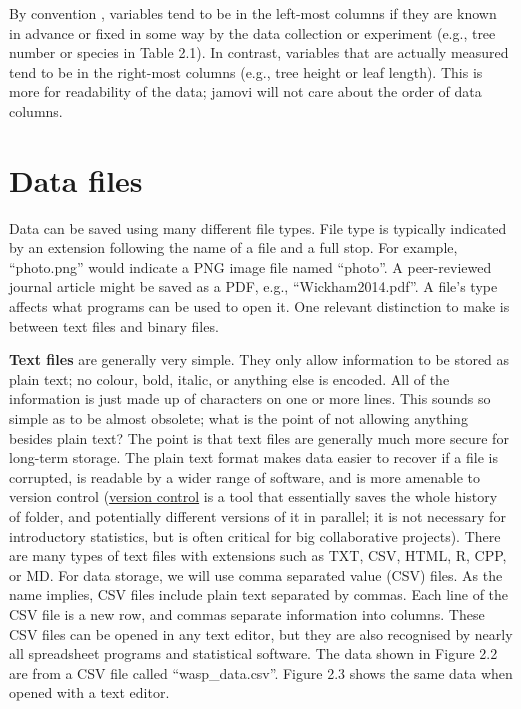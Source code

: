 \documentclass[
  openany]{scrbook}
\begin{document}
By convention \citep{Wickham2014}, variables tend to be in the left-most columns if they are known in advance or fixed in some way by the data collection or experiment (e.g., tree number or species in Table 2.1).
In contrast, variables that are actually measured tend to be in the right-most columns (e.g., tree height or leaf length).
This is more for readability of the data; jamovi will not care about the order of data columns.

\hypertarget{data-files}{%
\section{Data files}\label{data-files}}

Data can be saved using many different file types.
File type is typically indicated by an extension following the name of a file and a full stop.
For example, ``photo.png'' would indicate a PNG image file named ``photo''.
A peer-reviewed journal article might be saved as a PDF, e.g., ``Wickham2014.pdf''.
A file's type affects what programs can be used to open it.
One relevant distinction to make is between text files and binary files.

\textbf{Text files} are generally very simple.
They only allow information to be stored as plain text; no colour, bold, italic, or anything else is encoded.
All of the information is just made up of characters on one or more lines.
This sounds so simple as to be almost obsolete; what is the point of not allowing anything besides plain text?
The point is that text files are generally much more secure for long-term storage.
The plain text format makes data easier to recover if a file is corrupted, is readable by a wider range of software, and is more amenable to version control (\href{https://bradduthie.github.io/version_control/vc_notes.html}{version control} is a tool that essentially saves the whole history of folder, and potentially different versions of it in parallel; it is not necessary for introductory statistics, but is often critical for big collaborative projects).
There are many types of text files with extensions such as TXT, CSV, HTML, R, CPP, or MD.
For data storage, we will use comma separated value (CSV) files.
As the name implies, CSV files include plain text separated by commas.
Each line of the CSV file is a new row, and commas separate information into columns.
These CSV files can be opened in any text editor, but they are also recognised by nearly all spreadsheet programs and statistical software.
The data shown in Figure 2.2 are from a CSV file called ``wasp\_data.csv''.
Figure 2.3 shows the same data when opened with a text editor.
\end{document}
